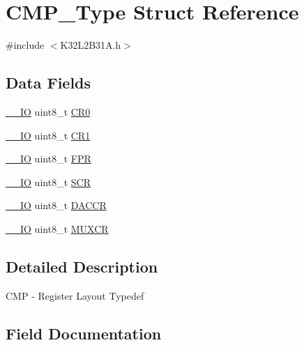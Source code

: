 \hypertarget{struct_c_m_p___type}{}\section{C\+M\+P\+\_\+\+Type Struct Reference}
\label{struct_c_m_p___type}


{\ttfamily \#include $<$K32\+L2\+B31\+A.\+h$>$}

\subsection*{Data Fields}
\begin{DoxyCompactItemize}
\item 
\mbox{\hyperlink{core__cm0plus_8h_aec43007d9998a0a0e01faede4133d6be}{\+\_\+\+\_\+\+IO}} uint8\+\_\+t \mbox{\hyperlink{struct_c_m_p___type_a02e7a916df429e8749930cda0f1bd9e3}{C\+R0}}
\item 
\mbox{\hyperlink{core__cm0plus_8h_aec43007d9998a0a0e01faede4133d6be}{\+\_\+\+\_\+\+IO}} uint8\+\_\+t \mbox{\hyperlink{struct_c_m_p___type_abdb5e2aed90a3a46151c8bb740665579}{C\+R1}}
\item 
\mbox{\hyperlink{core__cm0plus_8h_aec43007d9998a0a0e01faede4133d6be}{\+\_\+\+\_\+\+IO}} uint8\+\_\+t \mbox{\hyperlink{struct_c_m_p___type_a366faa2333304f3085d824a6b21d6f43}{F\+PR}}
\item 
\mbox{\hyperlink{core__cm0plus_8h_aec43007d9998a0a0e01faede4133d6be}{\+\_\+\+\_\+\+IO}} uint8\+\_\+t \mbox{\hyperlink{struct_c_m_p___type_a3fa18be8bc25b11eff5d36fbad087a91}{S\+CR}}
\item 
\mbox{\hyperlink{core__cm0plus_8h_aec43007d9998a0a0e01faede4133d6be}{\+\_\+\+\_\+\+IO}} uint8\+\_\+t \mbox{\hyperlink{struct_c_m_p___type_a67ee6ed882d48b23ff9b82a947a1e2ea}{D\+A\+C\+CR}}
\item 
\mbox{\hyperlink{core__cm0plus_8h_aec43007d9998a0a0e01faede4133d6be}{\+\_\+\+\_\+\+IO}} uint8\+\_\+t \mbox{\hyperlink{struct_c_m_p___type_aaa661e87917570b0139052849a7a1dae}{M\+U\+X\+CR}}
\end{DoxyCompactItemize}


\subsection{Detailed Description}
C\+MP -\/ Register Layout Typedef 

\subsection{Field Documentation}
\mbox{\label{struct_c_m_p___type_a02e7a916df429e8749930cda0f1bd9e3}} 
